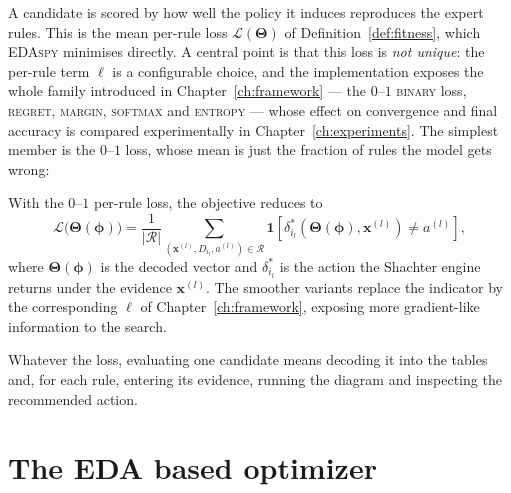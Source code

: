 A candidate is scored by how well the policy it induces reproduces the
expert rules. This is the mean per-rule loss
$\mathcal{L}(\boldsymbol{\Theta})$ of
Definition~\ref{def:fitness}, which \textsc{EDAspy} minimises directly.
A central point is that this loss is \emph{not unique}: the per-rule
term $\ell$ is a configurable choice, and the implementation exposes the
whole family introduced in Chapter~\ref{ch:framework} — the $0$--$1$
\textsc{binary} loss, \textsc{regret}, \textsc{margin}, \textsc{softmax}
and \textsc{entropy} — whose effect on convergence and final accuracy is
compared experimentally in Chapter~\ref{ch:experiments}. The simplest member is the
$0$--$1$ loss, whose mean is just the fraction of rules the model gets
wrong:

\begin{definition}
\label{def:cost}
With the $0$--$1$ per-rule loss, the objective reduces to
\[
   \mathcal{L}\bigl(\boldsymbol{\Theta}(\boldsymbol{\phi})\bigr) =
   \frac{1}{|\mathcal{R}|}
   \sum_{(\mathbf{x}^{(l)}, D_{i_l}, a^{(l)})\in\mathcal{R}}
   \mathbf{1}\!\left[\delta^{*}_{i_l}\!\left(\boldsymbol{\Theta}
   (\boldsymbol{\phi}),\mathbf{x}^{(l)}\right) \neq a^{(l)}\right],
\]
where $\boldsymbol{\Theta}(\boldsymbol{\phi})$ is the decoded vector and
$\delta^{*}_{i_l}$ is the action the Shachter engine returns under the
evidence $\mathbf{x}^{(l)}$. The smoother variants replace the
indicator by the corresponding $\ell$ of
Chapter~\ref{ch:framework}, exposing more gradient-like information to
the search.
\end{definition}

Whatever the loss, evaluating one candidate means decoding it into the
tables and, for each rule, entering its evidence, running the diagram and
inspecting the recommended action.

\section{The EDA based optimizer}

